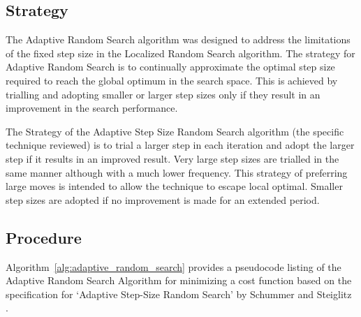 \subsection{Strategy}
The Adaptive Random Search algorithm was designed to address the limitations of the fixed step size in the Localized Random Search algorithm. The strategy for Adaptive Random Search is to continually approximate the optimal step size required to reach the global optimum in the search space. This is achieved by trialling and adopting smaller or larger step sizes only if they result in an improvement in the search performance.

The Strategy of the Adaptive Step Size Random Search algorithm (the specific technique reviewed) is to trial a larger step in each iteration and adopt the larger step if it results in an improved result. Very large step sizes are trialled in the same manner although with a much lower frequency. This strategy of preferring large moves is intended to allow the technique to escape local optimal. Smaller step sizes are adopted if no improvement is made for an extended period.

\subsection{Procedure}
Algorithm~\ref{alg:adaptive_random_search} provides a pseudocode listing of the Adaptive Random Search Algorithm for minimizing a cost function based on the specification for `Adaptive Step-Size Random Search' by Schummer and Steiglitz \cite{Schumer1968}.

